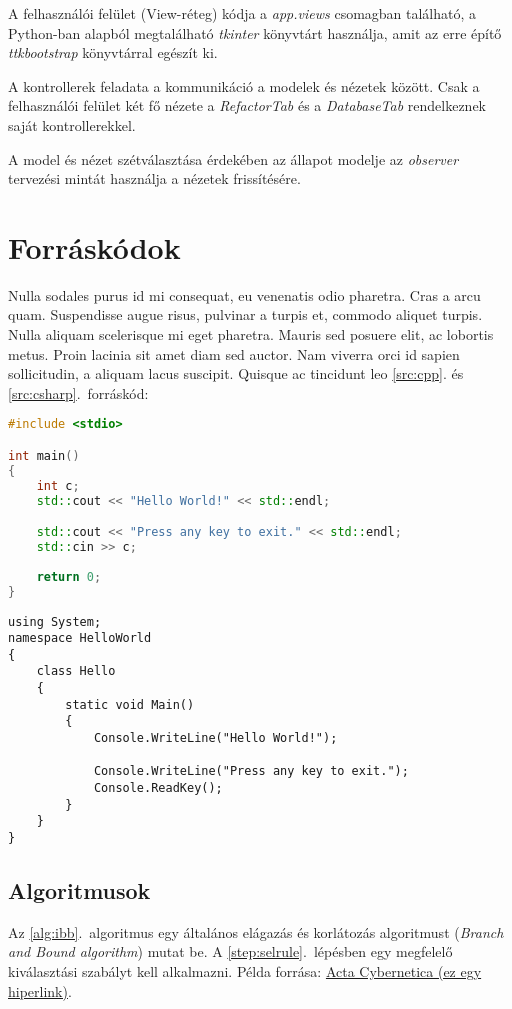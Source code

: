 A felhasználói felület (View-réteg) kódja a \emph{app.views} csomagban található,
a Python-ban alapból megtalálható \emph{tkinter} könyvtárt használja, amit az 
erre építő \emph{ttkbootstrap} könyvtárral egészít ki.

A kontrollerek feladata a kommunikáció a modelek és nézetek között.
Csak a felhasználói felület két fő nézete a \emph{RefactorTab} és a \emph{DatabaseTab} 
rendelkeznek saját kontrollerekkel.

A model és nézet szétválasztása érdekében az állapot modelje az \emph{observer} 
tervezési mintát használja a nézetek frissítésére.

\section{Forráskódok}

Nulla sodales purus id mi consequat, eu venenatis odio pharetra. Cras a arcu quam. Suspendisse augue risus, pulvinar a turpis et, commodo aliquet turpis. Nulla aliquam scelerisque mi eget pharetra. Mauris sed posuere elit, ac lobortis metus. Proin lacinia sit amet diam sed auctor. Nam viverra orci id sapien sollicitudin, a aliquam lacus suscipit. Quisque ac tincidunt leo \ref{src:cpp}. és \ref{src:csharp}.~forráskód:

\begin{lstlisting}[language={C++}]
#include <stdio>

int main() 
{
	int c;
	std::cout << "Hello World!" << std::endl;

	std::cout << "Press any key to exit." << std::endl;
	std::cin >> c;
	
	return 0;
}
\end{lstlisting}

\begin{lstlisting}[language={[Sharp]C}]
using System;
namespace HelloWorld
{
	class Hello 
	{
		static void Main() 
		{
			Console.WriteLine("Hello World!");
			
			Console.WriteLine("Press any key to exit.");
			Console.ReadKey();
		}
	}
}
\end{lstlisting}

\subsection{Algoritmusok}

Az \ref{alg:ibb}.~algoritmus egy általános elágazás és korlátozás algoritmust (\emph{Branch and Bound algorithm}) mutat be. A \ref{step:selrule}.~lépésben egy megfelelő kiválasztási szabályt kell alkalmazni.
Példa forrása: \href{https://www.inf.u-szeged.hu/actacybernetica/}{Acta Cybernetica (ez egy hiperlink)}.

